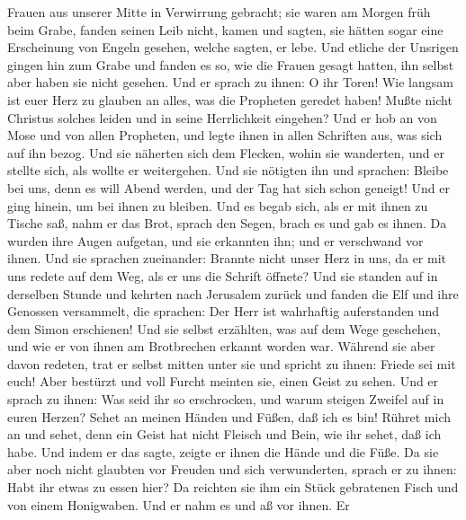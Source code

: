 Frauen aus unserer Mitte in Verwirrung gebracht; sie waren am Morgen
früh beim Grabe,  fanden seinen Leib nicht, kamen und
sagten, sie hätten sogar eine Erscheinung von Engeln gesehen, welche
sagten, er lebe.  Und etliche der Unsrigen gingen hin zum
Grabe und fanden es so, wie die Frauen gesagt hatten, ihn selbst aber
haben sie nicht gesehen.  Und er sprach zu ihnen: O ihr
Toren! Wie langsam ist euer Herz zu glauben an alles, was die Propheten
geredet haben!  Mußte nicht Christus solches leiden und
in seine Herrlichkeit eingehen?  Und er hob an von Mose
und von allen Propheten, und legte ihnen in allen Schriften aus, was
sich auf ihn bezog.  Und sie näherten sich dem Flecken,
wohin sie wanderten, und er stellte sich, als wollte er weitergehen.
 Und sie nötigten ihn und sprachen: Bleibe bei uns, denn
es will Abend werden, und der Tag hat sich schon geneigt! Und er ging
hinein, um bei ihnen zu bleiben.  Und es begab sich, als
er mit ihnen zu Tische saß, nahm er das Brot, sprach den Segen, brach es
und gab es ihnen.  Da wurden ihre Augen aufgetan, und sie
erkannten ihn; und er verschwand vor ihnen.  Und sie
sprachen zueinander: Brannte nicht unser Herz in uns, da er mit uns
redete auf dem Weg, als er uns die Schrift öffnete?  Und
sie standen auf in derselben Stunde und kehrten nach Jerusalem zurück
und fanden die Elf und ihre Genossen versammelt,  die
sprachen: Der Herr ist wahrhaftig auferstanden und dem Simon erschienen!
 Und sie selbst erzählten, was auf dem Wege geschehen,
und wie er von ihnen am Brotbrechen erkannt worden war. 
Während sie aber davon redeten, trat er selbst mitten unter sie und
spricht zu ihnen: Friede sei mit euch!  Aber bestürzt und
voll Furcht meinten sie, einen Geist zu sehen.  Und er
sprach zu ihnen: Was seid ihr so erschrocken, und warum steigen Zweifel
auf in euren Herzen?  Sehet an meinen Händen und Füßen,
daß ich es bin! Rühret mich an und sehet, denn ein Geist hat nicht
Fleisch und Bein, wie ihr sehet, daß ich habe.  Und indem
er das sagte, zeigte er ihnen die Hände und die Füße.  Da
sie aber noch nicht glaubten vor Freuden und sich verwunderten, sprach
er zu ihnen: Habt ihr etwas zu essen hier?  Da reichten
sie ihm ein Stück gebratenen Fisch und von einem Honigwaben.
 Und er nahm es und aß vor ihnen.  Er
